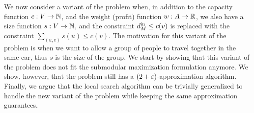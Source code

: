 We now consider a variant of the problem when, in addition to the
capacity function $c:V \to \N$, and the weight (profit) function
$w:A \to \R$, we also have a size function $s:V \to \N$, and the
constraint $\din[M] \leq c(v)$ is replaced with the constraint
$\sum_{(u,v)}s(u) \leq c(v)$.  The motivation for this variant of
the problem is when we want to allow a group of people to travel
together in the same car, thus $s$ is the size of the group.  We start
by showing that this variant of the problem does not fit the
submodular maximization formulation anymore. We show, however, that
the problem still has a $(2 +\eps)$-approximation algorithm.  Finally,
we argue that the local search algorithm can be trivially generalized
to handle the new variant of the problem while keeping the same
approximation guarantees.